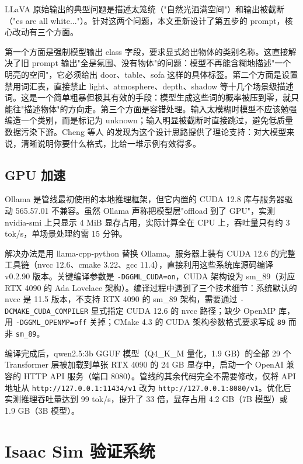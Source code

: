LLaVA 原始输出的典型问题是描述太笼统（"自然光洒满空间"）和输出被截断（"es are all white..."）。针对这两个问题，本文重新设计了第五步的 prompt，核心改动有三个方面。

第一个方面是强制模型输出 class 字段，要求显式给出物体的类别名称。这直接解决了旧 prompt 输出"全是氛围、没有物体"的问题：模型不再能含糊地描述"一个明亮的空间"，它必须给出 door、table、sofa 这样的具体标签。第二个方面是设置禁用词汇表，直接禁止 light、atmosphere、depth、shadow 等十几个场景级描述词。这是一个简单粗暴但极其有效的手段：模型生成这些词的概率被压到零，就只能往"描述物体"的方向走。第三个方面是容错处理。输入太模糊时模型不应该勉强编造一个类别，而是标记为 unknown；输入明显被截断时直接跳过，避免低质量数据污染下游。Cheng 等人\cite{chain_of_thought} 的发现为这个设计思路提供了理论支持：对大模型来说，清晰说明你要什么格式，比给一堆示例有效得多。

\subsection{GPU 加速}

Ollama 是管线最初使用的本地推理框架，但它内置的 CUDA 12.8 库与服务器驱动 565.57.01 不兼容。虽然 Ollama 声称把模型层"offload 到了 GPU"，实测 nvidia-smi 上只显示 4 MiB 显存占用，实际计算全在 CPU 上，吞吐量只有约 3 tok/s，单场景处理约需 15 分钟。

解决办法是用 llama-cpp-python 替换 Ollama。服务器上装有 CUDA 12.6 的完整工具链（nvcc 12.6、cmake 3.22、gcc 11.4），直接利用这些系统库源码编译 v0.2.90 版本。关键编译参数是 \texttt{-DGGML\_CUDA=on}，CUDA 架构设为 sm\_89（对应 RTX 4090 的 Ada Lovelace 架构）。编译过程中遇到了三个技术细节：系统默认的 nvcc 是 11.5 版本，不支持 RTX 4090 的 sm\_89 架构，需要通过 \texttt{-DCMAKE\_CUDA\_COMPILER} 显式指定 CUDA 12.6 的 nvcc 路径；缺少 OpenMP 库，用 \texttt{-DGGML\_OPENMP=off} 关掉；CMake 4.3 的 CUDA 架构参数格式要求写成 \texttt{89} 而非 \texttt{sm\_89}。

编译完成后，qwen2.5:3b GGUF 模型（Q4\_K\_M 量化，1.9 GB）的全部 29 个 Transformer 层被加载到单张 RTX 4090 的 24 GB 显存中，启动一个 OpenAI 兼容的 HTTP API 服务（端口 8080）。管线的其余代码完全不需要修改，仅将 API 地址从 \texttt{http://127.0.0.1:11434/v1} 改为 \texttt{http://127.0.0.1:8080/v1}。优化后实测推理吞吐量达到 99 tok/s，提升了 33 倍，显存占用 4.2 GB（7B 模型）或 1.9 GB（3B 模型）。

\section{Isaac Sim 验证系统}

